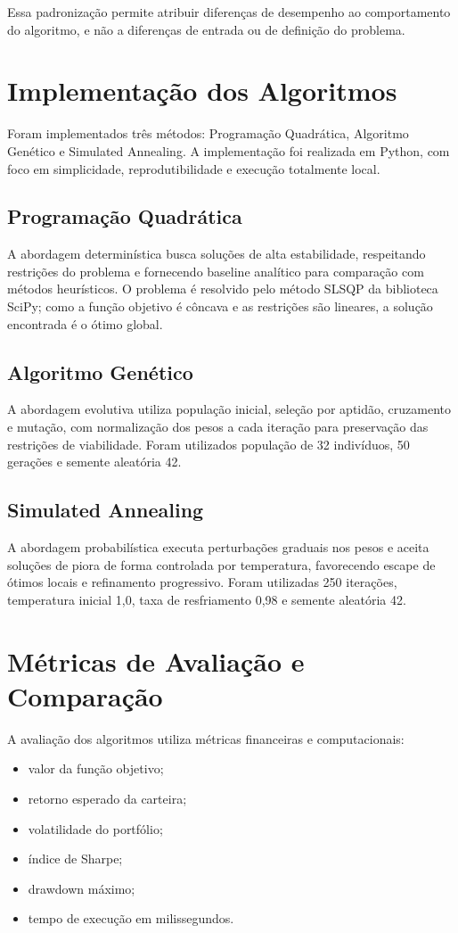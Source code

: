\documentclass[
  12pt,
  oneside,
  a4paper,
  brazil
]{abntex2}
\begin{document}
Essa padronização permite atribuir diferenças de desempenho ao comportamento do algoritmo, e não a diferenças de entrada ou de definição do problema.

\section{Implementação dos Algoritmos}
Foram implementados três métodos: Programação Quadrática, Algoritmo Genético e Simulated Annealing. A implementação foi realizada em Python, com foco em simplicidade, reprodutibilidade e execução totalmente local.

\subsection{Programação Quadrática}
A abordagem determinística busca soluções de alta estabilidade, respeitando restrições do problema e fornecendo baseline analítico para comparação com métodos heurísticos. O problema é resolvido pelo método SLSQP da biblioteca SciPy; como a função objetivo é côncava e as restrições são lineares, a solução encontrada é o ótimo global.

\subsection{Algoritmo Genético}
A abordagem evolutiva utiliza população inicial, seleção por aptidão, cruzamento e mutação, com normalização dos pesos a cada iteração para preservação das restrições de viabilidade. Foram utilizados população de 32 indivíduos, 50 gerações e semente aleatória 42.

\subsection{Simulated Annealing}
A abordagem probabilística executa perturbações graduais nos pesos e aceita soluções de piora de forma controlada por temperatura, favorecendo escape de ótimos locais e refinamento progressivo. Foram utilizadas 250 iterações, temperatura inicial 1,0, taxa de resfriamento 0,98 e semente aleatória 42.

\section{Métricas de Avaliação e Comparação}
A avaliação dos algoritmos utiliza métricas financeiras e computacionais:
\begin{itemize}
  \item valor da função objetivo;
  \item retorno esperado da carteira;
  \item volatilidade do portfólio;
  \item índice de Sharpe;
  \item drawdown máximo;
  \item tempo de execução em milissegundos.
\end{itemize}
\end{document}
